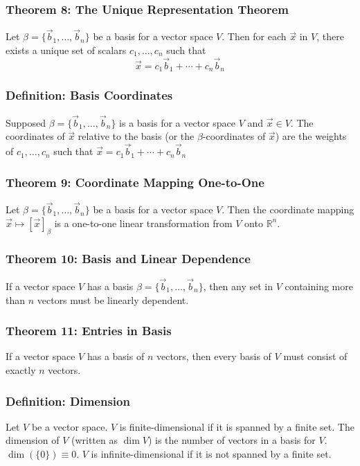\documentclass{article}
\begin{document}
\subsubsection*{Theorem 8: The Unique Representation Theorem}
Let $\beta = \{ \vec b_1 , \dots, \vec b_n \}$ be a basis for a vector space $V$. Then for each $\vec x$ in $V$, there exists a unique set of scalars $c_1, \dots , c_n$ such that
$$\vec x = c_1 \vec b_1 + \cdots + c_n \vec b_n$$

\subsubsection*{Definition: Basis Coordinates}
Supposed $\beta = \{ \vec b_1 , \dots ,\vec b_n \}$ is a basis for a vector space $V$ and $\vec x \in V$. The coordinates of $\vec x$ relative to the basis (or the $\beta$-coordinates of $\vec x$) are the weights of $c_1 , \dots , c_n$ such that $\vec x = c_1 \vec b_1 + \cdots + c_n \vec b_n$

\subsubsection*{Theorem 9: Coordinate Mapping One-to-One}
Let $\beta = \{\vec b_1 , \dots , \vec b_n \}$ be a basis for a vector space $V$. Then the coordinate mapping $\vec x \mapsto [ \vec x ] _\beta$ is a one-to-one linear transformation from $V$ onto $\mathbb{R}^n$.

\subsubsection*{Theorem 10: Basis and Linear Dependence}
If a vector space $V$ has a basis $\beta = \{ \vec b_1 , \dots , \vec b_n \}$, then any set in $V$ containing more than $n$ vectors must be linearly dependent. 

\subsubsection*{Theorem 11: Entries in Basis}
If a vector space $V$ has a basis of $n$ vectors, then every basis of $V$ must consist of exactly $n$ vectors. 

\subsubsection*{Definition: Dimension}
Let $V$ be a vector space. $V$ is finite-dimensional if it is spanned by a finite set. The dimension of $V$ (written as $\dim V$) is the number of vectors in a basis for $V$. $\dim (\{0\}) \equiv 0$. $V$ is infinite-dimensional if it is not spanned by a finite set. 
\end{document}
